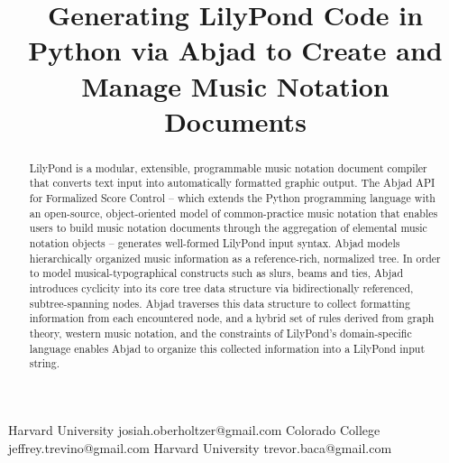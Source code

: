 \documentclass{sigplanconf}
\begin{document}
\setlength{\pdfpageheight}{\paperheight}
\setlength{\pdfpagewidth}{\paperwidth}



\title{Generating LilyPond Code in Python via Abjad to Create and Manage Music Notation Documents}

           {Harvard University}
           {josiah.oberholtzer@gmail.com}
           {Colorado College}
           {jeffrey.trevino@gmail.com}
           {Harvard University}
           {trevor.baca@gmail.com}

\maketitle

\begin{abstract}
LilyPond is a modular, extensible, programmable music notation document
compiler that converts text input into automatically formatted graphic output.
The Abjad API for Formalized Score Control -- which extends the Python
programming language with an open-source, object-oriented model of
common-practice music notation that enables users to build music notation
documents through the aggregation of elemental music notation objects --
generates well-formed LilyPond input syntax. Abjad models hierarchically
organized music information as a reference-rich, normalized tree. In order to
model musical-typographical constructs such as slurs, beams and ties, Abjad
introduces cyclicity into its core tree data structure via bidirectionally
referenced, subtree-spanning nodes. Abjad traverses this data structure to
collect formatting information from each encountered node, and a hybrid set of
rules derived from graph theory, western music notation, and the constraints of
LilyPond's domain-specific language enables Abjad to organize this collected
information into a LilyPond input string.
\end{abstract}

\end{document}
